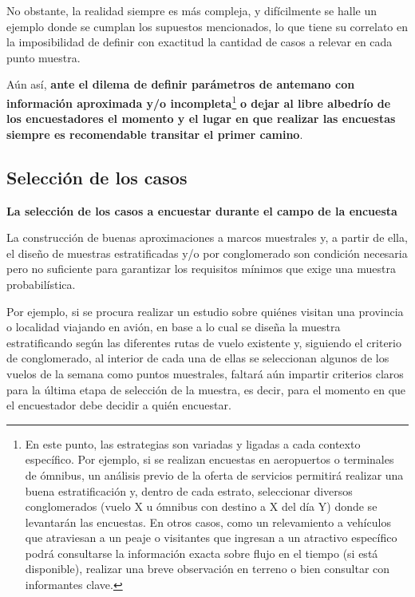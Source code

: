\documentclass[
]{book}
\begin{document}
No obstante, la realidad siempre es más compleja, y difícilmente se halle un ejemplo donde se cumplan los supuestos mencionados, lo que tiene su correlato en la imposibilidad de definir con exactitud la cantidad de casos a relevar en cada punto muestra.

\hfill\break
Aún así, \textbf{ante el dilema de definir parámetros de antemano con información aproximada y/o incompleta}\footnote{En este punto, las estrategias son variadas y ligadas a cada contexto específico. Por ejemplo, si se realizan encuestas en aeropuertos o terminales de ómnibus, un análisis previo de la oferta de servicios permitirá realizar una buena estratificación y, dentro de cada estrato, seleccionar diversos conglomerados (vuelo X u ómnibus con destino a X del día Y) donde se levantarán las encuestas. En otros casos, como un relevamiento a vehículos que atraviesan a un peaje o visitantes que ingresan a un atractivo específico podrá consultarse la información exacta sobre flujo en el tiempo (si está disponible), realizar una breve observación en terreno o bien consultar con informantes clave.} \textbf{o dejar al libre albedrío de los encuestadores el momento y el lugar en que realizar las encuestas siempre es recomendable transitar el primer camino}.

\hypertarget{selecciuxf3n-de-los-casos}{%
\subsection{Selección de los casos}\label{selecciuxf3n-de-los-casos}}

\textbf{La selección de los casos a encuestar durante el campo de la encuesta}

La construcción de buenas aproximaciones a marcos muestrales y, a partir de ella, el diseño de muestras estratificadas y/o por conglomerado son condición necesaria pero no suficiente para garantizar los requisitos mínimos que exige una muestra probabilística.

Por ejemplo, si se procura realizar un estudio sobre quiénes visitan una provincia o localidad viajando en avión, en base a lo cual se diseña la muestra estratificando según las diferentes rutas de vuelo existente y, siguiendo el criterio de conglomerado, al interior de cada una de ellas se seleccionan algunos de los vuelos de la semana como puntos muestrales, faltará aún impartir criterios claros para la última etapa de selección de la muestra, es decir, para el momento en que el encuestador debe decidir a quién encuestar.
\end{document}
